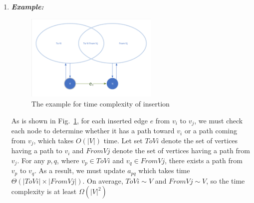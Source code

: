 \documentclass[12pt,a4paper]{article}
\makeatletter
\newtheorem*{solution}{Solution}
\theoremstyle{definition}
\renewenvironment{solution}[1][Solution] {\par\pushQED{\qed}\normalfont\topsep6\p@\@plus6\p@\relax\trivlist\item[\hskip\labelsep\bfseries#1\@addpunct{.}]\ignorespaces}{\popQED\endtrivlist\@endpefalse} \makeatother
\makeatother
\begin{document}
\begin{enumerate}
\begin{solution}
    \textbf{\textit{Example:}}
    \begin{figure}[!htbp]
        	\centering
        	\includegraphics[width=0.6\textwidth]{Fig-EXAMPLE.pdf}
        	\caption{The example for time complexity of insertion}
        	\label{Fig-EXAMPLE}
    	\end{figure}
    As is shown in Fig.~\ref{Fig-EXAMPLE}, for each inserted edge $e$ from $v_i$ to $v_j$, we must check each node to determine whether it has a path toward $v_i$ or a path coming from $v_j$, which takes $O(|V|)$ time. 
    Let set $ToVi$ denote the set of vertices having a path to $v_i$ and $FromVj$ denote the set of vertices having a path from $v_j$. For any $p,q$, where $v_p\in ToVi$ and $v_q\in FromVj$, there exists a path from $v_p$ to $v_q$. As a result, we must update $a_{pq}$ which takes time $\Theta (|ToVi|\times|FromVj|)$. On average, $ToVi\sim V$ and $FromVj\sim V$, so the time complexity is at least $\Omega (|V|^2)$
    

\end{solution}
\end{enumerate}
\end{document}
